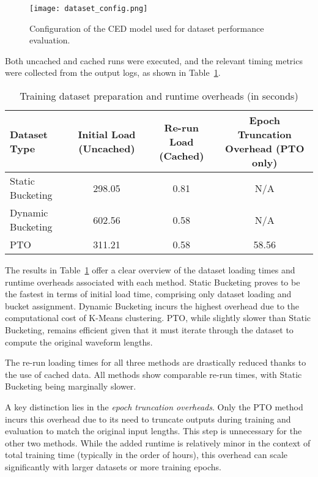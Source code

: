 \begin{figure}[H]
    \centering
    \texttt{[image: dataset\_config.png]}
    \caption{\label{fig:dataset_config} Configuration of the CED model used for dataset performance evaluation.}
\end{figure}

Both uncached and cached runs were executed, and the relevant timing metrics were collected from the output logs, as shown in Table~\ref{tab:dataset_loading_times}.

\vspace{1em}
\begin{table}[H]
\centering
\caption{Training dataset preparation and runtime overheads (in seconds)}
\label{tab:dataset_loading_times}
\begin{tabular}{|l|c|c|c|}
\hline
\textbf{Dataset Type} & \textbf{Initial Load (Uncached)} & \textbf{Re-run Load (Cached)} & \textbf{Epoch Truncation Overhead (PTO only)} \\
\hline
Static Bucketing  & 298.05  & 0.81  & N/A    \\
Dynamic Bucketing & 602.56  & 0.58  & N/A    \\
PTO               & 311.21  & 0.58  & 58.56  \\
\hline
\end{tabular}
\end{table}

The results in Table~\ref{tab:dataset_loading_times} offer a clear overview of the dataset loading times and runtime overheads associated with each method. Static Bucketing proves to be the fastest in terms of initial load time, comprising only dataset loading and bucket assignment. Dynamic Bucketing incurs the highest overhead due to the computational cost of K-Means clustering. PTO, while slightly slower than Static Bucketing, remains efficient given that it must iterate through the dataset to compute the original waveform lengths.

The re-run loading times for all three methods are drastically reduced thanks to the use of cached data. All methods show comparable re-run times, with Static Bucketing being marginally slower.

A key distinction lies in the \textit{epoch truncation overheads}. Only the PTO method incurs this overhead due to its need to truncate outputs during training and evaluation to match the original input lengths. This step is unnecessary for the other two methods. While the added runtime is relatively minor in the context of total training time (typically in the order of hours), this overhead can scale significantly with larger datasets or more training epochs.

